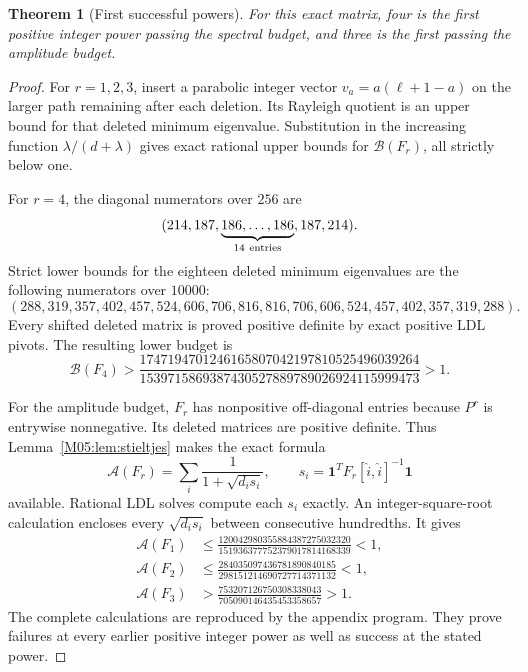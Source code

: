 \documentclass[11pt,a4paper,oneside]{report}
\newtheorem{theorem}{Theorem}[section]
\theoremstyle{definition}
\theoremstyle{remark}
\newcommand{\one}{\mathbf 1}
\newcommand{\BB}{\mathcal B}
\newcommand{\ABudget}{\mathcal A}
\begin{document}
\begin{theorem}[First successful powers]\label{M05:thm:firstpower}
For this exact matrix, four is the first positive integer power
passing the spectral budget, and three is the first passing the
amplitude budget.
\end{theorem}
\begin{proof}
For $r=1,2,3$, insert a parabolic integer vector
$v_a=a(\ell+1-a)$ on the larger path remaining after each deletion.
Its Rayleigh quotient is an upper bound for that deleted minimum
eigenvalue. Substitution in the increasing function
$\lambda/(d+\lambda)$ gives exact rational upper bounds for
$\BB(F_r)$, all strictly below one.

For $r=4$, the diagonal numerators over $256$ are
\[
 (214,187,\underbrace{186,\ldots,186}_{14\ {\rm entries}},187,214).
\]
Strict lower bounds for the eighteen deleted minimum eigenvalues
are the following numerators over $10000$:
\[
 (288,319,357,402,457,524,606,706,816,
  816,706,606,524,457,402,357,319,288).
\]
Every shifted deleted matrix is proved positive definite by exact
positive LDL pivots. The resulting lower budget is
\begin{equation}\label{M05:eq:fourlower}
 \BB(F_4)>
 \frac{1747194701246165807042197810525496039264}
 {1539715869387430527889789026924115999473}>1.
\end{equation}

For the amplitude budget, $F_r$ has nonpositive off-diagonal
entries because $P^r$ is entrywise nonnegative. Its deleted
matrices are positive definite. Thus Lemma~\ref{M05:lem:stieltjes}
makes the exact formula
\[
 \ABudget(F_r)=\sum_i\frac1{1+\sqrt{d_i s_i}},
 \qquad s_i=\one^TF_r[\widehat i,\widehat i]^{-1}\one
\]
available. Rational LDL solves compute each $s_i$ exactly.
An integer-square-root calculation encloses every $\sqrt{d_i s_i}$
between consecutive hundredths. It gives
\begin{align}
 \ABudget(F_1)&\le
 \frac{120042980355884387275032320}
 {151936377752379017814168339}<1,\label{M05:eq:hybridone}\\
 \ABudget(F_2)&\le
 \frac{284035097436781890840185}
 {298151214690727714371132}<1,\label{M05:eq:hybridtwo}\\
 \ABudget(F_3)&>
 \frac{753207126750308338043}
 {705090146435453358657}>1.\label{M05:eq:hybridthree}
\end{align}
The complete calculations are reproduced by the appendix program.
They prove failures at every earlier positive integer power as
well as success at the stated power.
\end{proof}
\end{document}
